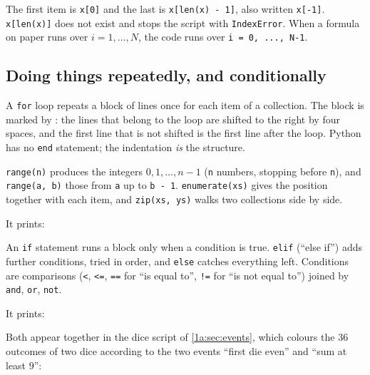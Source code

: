 \begin{pitfall}
The first item is \texttt{x[0]} and the last is \texttt{x[len(x) - 1]}, also written \texttt{x[-1]}. \texttt{x[len(x)]} does not exist and stops the script with \texttt{IndexError}. When a formula on paper runs over $i=1,\dots,N$, the code runs over \texttt{i = 0, ..., N-1}.
\end{pitfall}

\subsection{Doing things repeatedly, and conditionally}
\label{T0a:sec:control}

A \texttt{for} loop repeats a block of lines once for each item of a collection. The block is marked by : the lines that belong to the loop are shifted to the right by four spaces, and the first line that is not shifted is the first line after the loop. Python has no \texttt{end} statement; the indentation \emph{is} the structure.

\texttt{range(n)} produces the integers $0,1,\dots,n-1$ (\texttt{n} numbers, stopping before \texttt{n}), and \texttt{range(a, b)} those from \texttt{a} up to \texttt{b - 1}. \texttt{enumerate(xs)} gives the position together with each item, and \texttt{zip(xs, ys)} walks two collections side by side.

\noindent It prints:

An \texttt{if} statement runs a block only when a condition is true. \texttt{elif} (``else if'') adds further conditions, tried in order, and \texttt{else} catches everything left. Conditions are comparisons (\texttt{<}, \texttt{<=}, \texttt{==} for ``is equal to'', \texttt{!=} for ``is not equal to'') joined by \texttt{and}, \texttt{or}, \texttt{not}.

\noindent It prints:

Both appear together in the dice script of \cref{1a:sec:events}, which colours the $36$ outcomes of two dice according to the two events ``first die even'' and ``sum at least $9$'':


